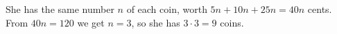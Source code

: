 She has the same number $n$ of each coin, worth $5n+10n+25n=40n$ cents. From $40n=120$ we get $n=3$, so she has $3\cdot3=\boxed{9}$ coins.
